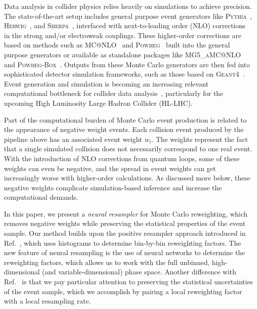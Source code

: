 \documentclass[prd,twocolumn,superscriptaddress,longbibliography,preprintnumbers,floatfix,nofootinbib]{revtex4-1}
\DeclareRobustCommand{\Ref}[1]{Ref.~\cite{#1}}
\begin{document}
Data analysis in collider physics relies heavily on simulations to achieve precision.
%
The state-of-the-art setup includes general purpose event generators like \textsc{Pythia}~\cite{Sjostrand:2014zea}, \textsc{Herwig}~\cite{Bellm:2015jjp}, and \textsc{Sherpa}~\cite{Bothmann:2019yzt}, interfaced with next-to-leading order (NLO) corrections in the strong and/or electroweak couplings.
%
These higher-order corrections are based on methods such as \textsc{MC@NLO}~\cite{Nason:2006hfa} and \textsc{Powheg}~\cite{Frixione:2002ik} built into the general purpose generators or available as standalone packages like \textsc{MG5\_aMC@NLO}~\cite{Alwall:2014hca} and \textsc{Powheg-Box}~\cite{Alioli:2010xd}.
%
Outputs from these Monte Carlo generators are then fed into sophisticated detector simulation frameworks, such as those based on \textsc{Geant4}~\cite{Agostinelli:2002hh}.
%
Event generation and simulation is becoming an increasing relevant computational bottleneck for collider data analysis~\cite{Alves:2017she,Valassi:2020ueh}, particularly for the upcoming High Luminosity Large Hadron Collider (HL-LHC).


Part of the computational burden of Monte Carlo event production is related to the appearance of negative weight events.
%
Each collision event produced by the pipeline above has an associated event weight $w_i$.
%
The weights represent the fact that a single simulated collision does not necessarily correspond to one real event.
%
With the introduction of NLO corrections from quantum loops, some of these weights can even be negative, and the spread in event weights can get increasingly worse with higher-order calculations.
%
As discussed more below, these negative weights complicate simulation-based inference and increase the computational demands.


In this paper, we present a \emph{neural resampler} for Monte Carlo reweighting, which removes negative weights while preserving the statistical properties of the event sample.
%
Our method builds upon the positive resampler approach introduced in \Ref{andersen2020positive}, which uses histograms to determine bin-by-bin reweighting factors.
%
The new feature of neural resampling is the use of neural networks to determine the reweighting factors, which allows us to work with the full unbinned, high-dimensional (and variable-dimensional) phase space.
%
Another difference with \Ref{andersen2020positive} is that we pay particular attention to preserving the statistical uncertainties of the event sample, which we accomplish by pairing a local reweighting factor with a local resampling rate.
\end{document}
